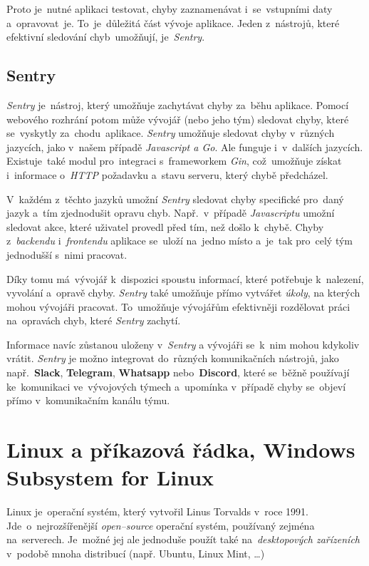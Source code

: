 \documentclass[11pt,a4paper]{report}
\begin{document}
                Proto je~nutné aplikaci testovat, chyby zaznamenávat i~se~vstupními daty a~opravovat~je. To~je~důležitá část vývoje aplikace. Jeden z~nástrojů, které efektivní sledování chyb~umožňují, je~\emph{Sentry}.

            \subsection{Sentry}
                \emph{Sentry} je~nástroj, který umožňuje zachytávat chyby za~běhu aplikace. Pomocí webového rozhrání potom může vývojář (nebo jeho tým) sledovat chyby, které se~vyskytly za~chodu~aplikace. \emph{Sentry} umožňuje sledovat chyby v~různých jazycích, jako v~našem případě \emph{Javascript a Go}. Ale funguje i~v~dalších jazycích. Existuje~také modul pro~integraci s~frameworkem \emph{Gin}, což~umožňuje získat i~informace o~\emph{HTTP} požadavku a~stavu serveru, který chybě předcházel.
                
                V~každém z~těchto jazyků umožní \emph{Sentry} sledovat chyby specifické pro~daný jazyk a~tím zjednodušit opravu chyb. Např.~v~případě \emph{Javascriptu} umožní sledovat akce, které uživatel provedl před tím, než došlo k~chybě. Chyby z~\emph{backendu} i~\emph{frontendu} aplikace se~uloží na~jedno místo a~je~tak pro~celý tým jednodušší s~nimi pracovat.

                Díky tomu má~vývojář k~dispozici spoustu informací, které potřebuje k~nalezení, vyvolání a~opravě chyby. \emph{Sentry} také umožňuje přímo vytvářet \emph{úkoly}, na kterých mohou vývojáři pracovat. To~umožňuje vývojářům efektivněji rozdělovat práci na~opravách chyb, které \emph{Sentry} zachytí.

                Informace navíc zůstanou uloženy v~\emph{Sentry} a vývojáři se~k~nim mohou kdykoliv vrátit. \emph{Sentry} je možno integrovat do~různých komunikačních nástrojů, jako např.~\textbf{Slack}, \textbf{Telegram}, \textbf{Whatsapp} nebo~\textbf{Discord}, které se~běžně používají ke~komunikaci ve~vývojových týmech a~upomínka v~případě chyby se~objeví přímo v~komunikačním kanálu týmu.

        \section{Linux a příkazová řádka, Windows Subsystem for Linux}
            Linux je~operační systém, který vytvořil Linus Torvalds v~roce 1991. Jde~o~nejrozšířenější \emph{open--source} operační systém, používaný zejména na~serverech. Je~možné jej ale jednoduše použít také na~\emph{desktopových zařízeních} v~podobě mnoha distribucí (např. Ubuntu, Linux Mint, \dots)
            
\end{document}
